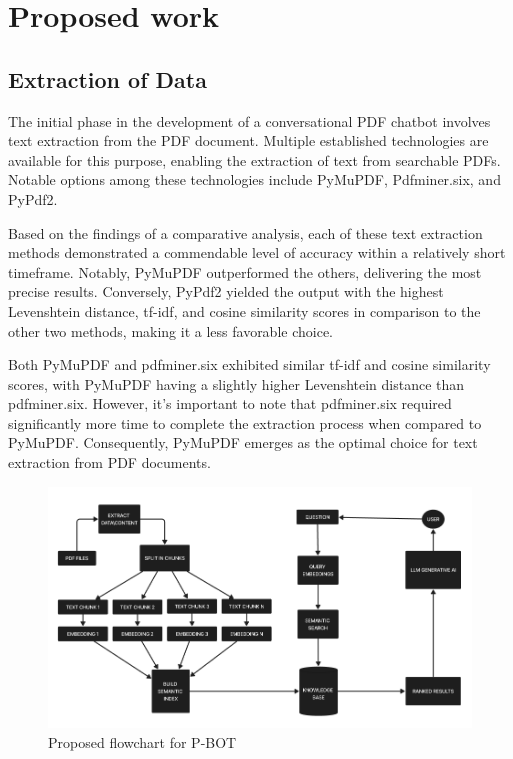 \documentclass[conference]{IEEEtran}
\begin{document}
\begin{table}
\begin{center}
\begin{tabular}{ |p{1cm}|p{2cm}|p{4cm}|p{4cm}|p{4cm}| }
\hline
\end{tabular}
\end{center}
\end{table}




\section{Proposed work}

\subsection{Extraction of Data}

The initial phase in the development of a conversational PDF chatbot involves text extraction from the PDF document. Multiple established technologies are available for this purpose, enabling the extraction of text from searchable PDFs. Notable options among these technologies include PyMuPDF, Pdfminer.six, and PyPdf2.

Based on the findings of a comparative analysis, each of these text extraction methods demonstrated a commendable level of accuracy within a relatively short timeframe. Notably, PyMuPDF outperformed the others, delivering the most precise results. Conversely, PyPdf2 yielded the output with the highest Levenshtein distance, tf-idf, and cosine similarity scores in comparison to the other two methods, making it a less favorable choice.

Both PyMuPDF and pdfminer.six exhibited similar tf-idf and cosine similarity scores, with PyMuPDF having a slightly higher Levenshtein distance than pdfminer.six. However, it's important to note that pdfminer.six required significantly more time to complete the extraction process when compared to PyMuPDF. Consequently, PyMuPDF emerges as the optimal choice for text extraction from PDF documents.

\begin{figure}
    \centering
    \includegraphics[width=\textwidth]{FLOWC}
    \caption{Proposed flowchart for P-BOT}
    \label{fig:your_image_label}
\end{figure}
\end{document}
